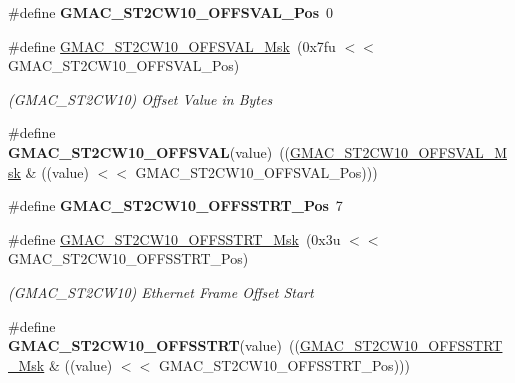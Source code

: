 \begin{DoxyCompactItemize}
\item 
\mbox{\label{group__SAME70__GMAC_gaf630978e5a8d5b8f76322f7a967e39d0}} 
\#define {\bfseries G\+M\+A\+C\+\_\+\+S\+T2\+C\+W10\+\_\+\+O\+F\+F\+S\+V\+A\+L\+\_\+\+Pos}~0
\item 
\mbox{\label{group__SAME70__GMAC_gae900e27a75eabf8330e037cd615f7b51}} 
\#define \mbox{\hyperlink{group__SAME70__GMAC_gae900e27a75eabf8330e037cd615f7b51}{G\+M\+A\+C\+\_\+\+S\+T2\+C\+W10\+\_\+\+O\+F\+F\+S\+V\+A\+L\+\_\+\+Msk}}~(0x7fu $<$$<$ G\+M\+A\+C\+\_\+\+S\+T2\+C\+W10\+\_\+\+O\+F\+F\+S\+V\+A\+L\+\_\+\+Pos)
\begin{DoxyCompactList}\small\item\em (G\+M\+A\+C\+\_\+\+S\+T2\+C\+W10) Offset Value in Bytes \end{DoxyCompactList}\item 
\mbox{\label{group__SAME70__GMAC_gae825778fadbaf984dcd819d9992895f8}} 
\#define {\bfseries G\+M\+A\+C\+\_\+\+S\+T2\+C\+W10\+\_\+\+O\+F\+F\+S\+V\+AL}(value)~((\mbox{\hyperlink{group__SAMV71__GMAC_gae900e27a75eabf8330e037cd615f7b51}{G\+M\+A\+C\+\_\+\+S\+T2\+C\+W10\+\_\+\+O\+F\+F\+S\+V\+A\+L\+\_\+\+Msk}} \& ((value) $<$$<$ G\+M\+A\+C\+\_\+\+S\+T2\+C\+W10\+\_\+\+O\+F\+F\+S\+V\+A\+L\+\_\+\+Pos)))
\item 
\mbox{\label{group__SAME70__GMAC_ga15116176e8936f68ba93463dd2d1c7a6}} 
\#define {\bfseries G\+M\+A\+C\+\_\+\+S\+T2\+C\+W10\+\_\+\+O\+F\+F\+S\+S\+T\+R\+T\+\_\+\+Pos}~7
\item 
\mbox{\label{group__SAME70__GMAC_gabc8690fb601150d928fd4632e489bad7}} 
\#define \mbox{\hyperlink{group__SAME70__GMAC_gabc8690fb601150d928fd4632e489bad7}{G\+M\+A\+C\+\_\+\+S\+T2\+C\+W10\+\_\+\+O\+F\+F\+S\+S\+T\+R\+T\+\_\+\+Msk}}~(0x3u $<$$<$ G\+M\+A\+C\+\_\+\+S\+T2\+C\+W10\+\_\+\+O\+F\+F\+S\+S\+T\+R\+T\+\_\+\+Pos)
\begin{DoxyCompactList}\small\item\em (G\+M\+A\+C\+\_\+\+S\+T2\+C\+W10) Ethernet Frame Offset Start \end{DoxyCompactList}\item 
\mbox{\label{group__SAME70__GMAC_ga18db0524df2c5c282278fa857ab81715}} 
\#define {\bfseries G\+M\+A\+C\+\_\+\+S\+T2\+C\+W10\+\_\+\+O\+F\+F\+S\+S\+T\+RT}(value)~((\mbox{\hyperlink{group__SAMV71__GMAC_gabc8690fb601150d928fd4632e489bad7}{G\+M\+A\+C\+\_\+\+S\+T2\+C\+W10\+\_\+\+O\+F\+F\+S\+S\+T\+R\+T\+\_\+\+Msk}} \& ((value) $<$$<$ G\+M\+A\+C\+\_\+\+S\+T2\+C\+W10\+\_\+\+O\+F\+F\+S\+S\+T\+R\+T\+\_\+\+Pos)))

\end{DoxyCompactItemize}
